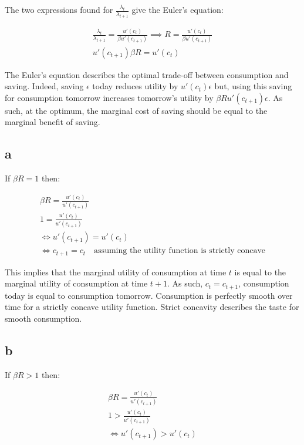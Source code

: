 \documentclass{article}
\begin{document}
The two expressions found for $\frac{\lambda_t}{\lambda_{t+1}}$ give the Euler's equation:

\begin{gather*}
        \frac{\lambda_t}{\lambda_{t+1}} = \frac{u'(c_t)}{\beta u'(c_{t+1})}
        \implies R = \frac{u'(c_t)}{\beta u'(c_{t+1})} \\
        u'(c_{t+1})\beta R = u'(c_t)
\end{gather*}

The Euler's equation describes the optimal trade-off between consumption and saving. Indeed, saving $\epsilon$ today reduces utility by $u'(c_t)\epsilon$ but, using this saving for consumption tomorrow increases tomorrow's utility by $\beta Ru'(c_{t+1})\epsilon$. As such, at the optimum, the marginal cost of saving should be equal to the marginal benefit of saving.

\subsection{a}

If $\beta R = 1$ then:

\begin{gather*}
        \beta R = \frac{u'(c_t)}{u'(c_{t+1})} \\
        1 = \frac{u'(c_t)}{u'(c_{t+1})} \\
        \Leftrightarrow u'(c_{t+1}) = u'(c_t) \\
        \Leftrightarrow c_{t+1} =c_{t} \quad \mbox{assuming the utility function is strictly concave}
\end{gather*}

This implies that the marginal utility of consumption at time $t$ is equal to the marginal utility of consumption at time $t+1$.
As such, $c_t=c_{t+1}$, consumption today is equal to consumption tomorrow. Consumption is perfectly smooth over time for a strictly concave utility function. Strict concavity describes the taste for smooth consumption.

\subsection{b}

If $\beta R > 1$ then:

\begin{gather*}
        \beta R = \frac{u'(c_t)}{u'(c_{t+1})} \\
        1 > \frac{u'(c_t)}{u'(c_{t+1})} \\
        \Leftrightarrow u'(c_{t+1}) > u'(c_t)
\end{gather*}
\end{document}
